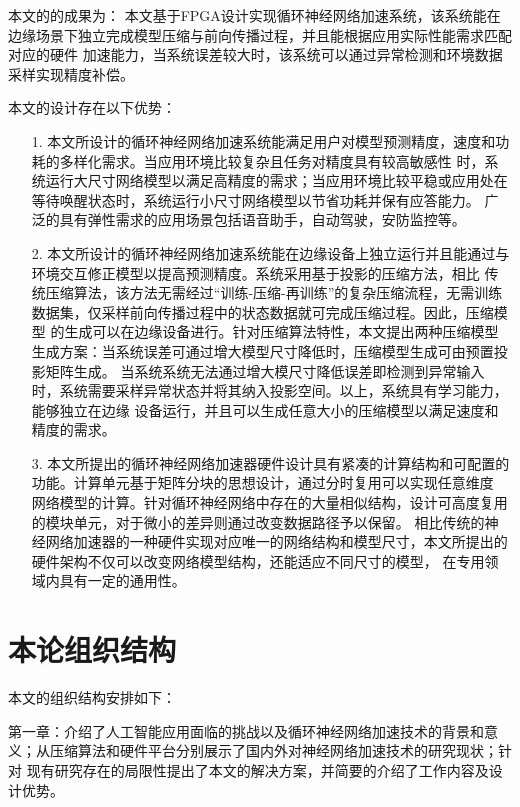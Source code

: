 本文的的成果为： 本文基于FPGA设计实现循环神经网络加速系统，该系统能在边缘场景下独立完成模型压缩与前向传播过程，并且能根据应用实际性能需求匹配对应的硬件
加速能力，当系统误差较大时，该系统可以通过异常检测和环境数据采样实现精度补偿。

本文的设计存在以下优势：

\begin{itemize}
\vspace{4pt}
\item[1.]本文所设计的循环神经网络加速系统能满足用户对模型预测精度，速度和功耗的多样化需求。当应用环境比较复杂且任务对精度具有较高敏感性
时，系统运行大尺寸网络模型以满足高精度的需求；当应用环境比较平稳或应用处在等待唤醒状态时，系统运行小尺寸网络模型以节省功耗并保有应答能力。
广泛的具有弹性需求的应用场景包括语音助手，自动驾驶，安防监控等。　

\vspace{4pt}
\item[2.]本文所设计的循环神经网络加速系统能在边缘设备上独立运行并且能通过与环境交互修正模型以提高预测精度。系统采用基于投影的压缩方法，相比
传统压缩算法，该方法无需经过“训练-压缩-再训练”的复杂压缩流程，无需训练数据集，仅采样前向传播过程中的状态数据就可完成压缩过程。因此，压缩模型
的生成可以在边缘设备进行。针对压缩算法特性，本文提出两种压缩模型生成方案：当系统误差可通过增大模型尺寸降低时，压缩模型生成可由预置投影矩阵生成。
当系统系统无法通过增大模尺寸降低误差即检测到异常输入时，系统需要采样异常状态并将其纳入投影空间。以上，系统具有学习能力，能够独立在边缘
设备运行，并且可以生成任意大小的压缩模型以满足速度和精度的需求。

\vspace{4pt}
\item[3.]本文所提出的循环神经网络加速器硬件设计具有紧凑的计算结构和可配置的功能。计算单元基于矩阵分块的思想设计，通过分时复用可以实现任意维度
网络模型的计算。针对循环神经网络中存在的大量相似结构，设计可高度复用的模块单元，对于微小的差异则通过改变数据路径予以保留。
相比传统的神经网络加速器的一种硬件实现对应唯一的网络结构和模型尺寸，本文所提出的硬件架构不仅可以改变网络模型结构，还能适应不同尺寸的模型，
在专用领域内具有一定的通用性。
\vspace{4pt}
\end{itemize}

\section{本论组织结构}
本文的组织结构安排如下：

第一章：介绍了人工智能应用面临的挑战以及循环神经网络加速技术的背景和意义；从压缩算法和硬件平台分别展示了国内外对神经网络加速技术的研究现状；针对
现有研究存在的局限性提出了本文的解决方案，并简要的介绍了工作内容及设计优势。

